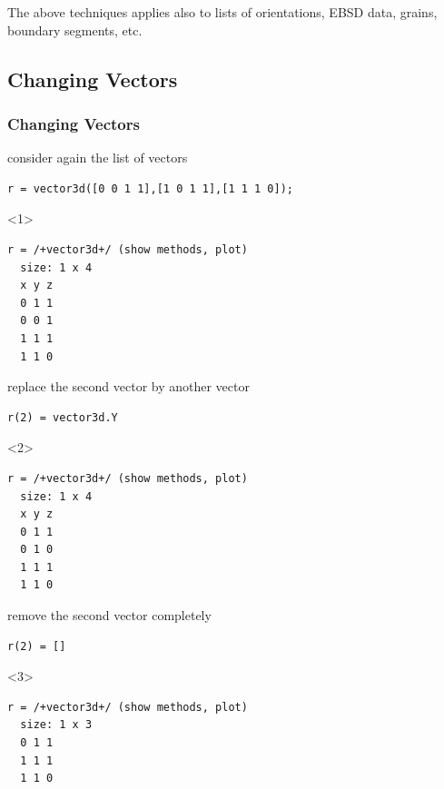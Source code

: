\documentclass[compress]{beamer}
\begin{document}
\begin{frame}[fragile]
\begin{overlayarea}{\textwidth}{8cm}
    \pause \medskip

    \alert{The above techniques applies also to lists of
    orientations, EBSD data, grains, boundary segments, etc.}
  \end{overlayarea}
\end{frame}


\subsection*{Changing Vectors}

\begin{frame}[fragile]
  \frametitle{Changing Vectors}

  \begin{overlayarea}{\textwidth}{8cm}

    consider again the list of vectors
    \begin{lstlisting}[style=input]
r = vector3d([0 0 1 1],[1 0 1 1],[1 1 1 0]);
    \end{lstlisting}

    \begin{onlyenv}<1>
      \vspace{-0.3cm}
      \begin{lstlisting}[style=output]
r = /+vector3d+/ (show methods, plot)
  size: 1 x 4
  x y z
  0 1 1
  0 0 1
  1 1 1
  1 1 0
      \end{lstlisting}
    \end{onlyenv}

    \pause \medskip

    replace the second vector by another vector
    \begin{lstlisting}[style=input]
r(2) = vector3d.Y
    \end{lstlisting}

    \begin{onlyenv}<2>
      \vspace{-0.3cm}
      \begin{lstlisting}[style=output]
r = /+vector3d+/ (show methods, plot)
  size: 1 x 4
  x y z
  0 1 1
  0 1 0
  1 1 1
  1 1 0
      \end{lstlisting}
    \end{onlyenv}

    \pause \medskip

    remove the second vector completely
    \begin{lstlisting}[style=input]
r(2) = []
    \end{lstlisting}
    \begin{onlyenv}<3>
      \vspace{-0.3cm}
      \begin{lstlisting}[style=output]
r = /+vector3d+/ (show methods, plot)
  size: 1 x 3
  0 1 1
  1 1 1
  1 1 0
      \end{lstlisting}
    \end{onlyenv}


\end{overlayarea}
\end{frame}
\end{document}
